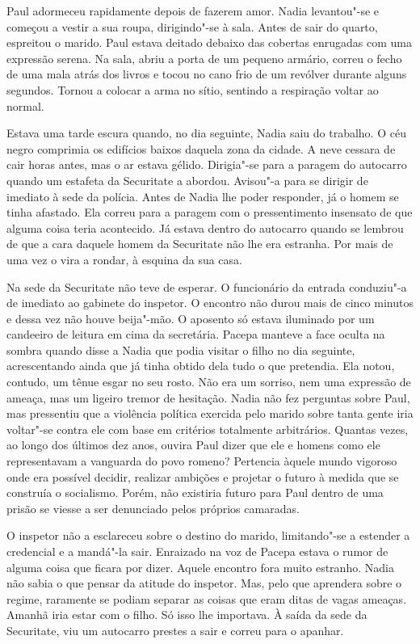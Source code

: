 Paul adormeceu rapidamente depois de fazerem amor. Nadia levantou"-se e
começou a vestir a sua roupa, dirigindo"-se à sala. Antes de sair do
quarto, espreitou o marido. Paul estava deitado debaixo das cobertas
enrugadas com uma expressão serena. Na sala, abriu a porta de um
pequeno armário, correu o fecho de uma mala atrás dos livros e tocou no
cano frio de um revólver durante alguns segundos. Tornou a colocar a
arma no sítio, sentindo a respiração voltar ao normal.

\bigskip

Estava uma tarde escura quando, no dia seguinte, Nadia saiu do trabalho.
O céu negro comprimia os edifícios baixos daquela zona da cidade. A
neve cessara de cair horas antes, mas o ar estava gélido. Dirigia"-se
para a paragem do autocarro quando um estafeta da Securitate a abordou.
Avisou"-a para se dirigir de imediato à sede da polícia. Antes de Nadia
lhe poder responder, já o homem se tinha afastado. Ela correu para a
paragem com o pressentimento insensato de que alguma coisa teria
acontecido. Já estava dentro do autocarro quando se lembrou de que a
cara daquele homem da Securitate não lhe era estranha. Por mais de uma
vez o vira a rondar, à esquina da sua casa.

Na sede da Securitate não
teve de esperar. O funcionário da entrada conduziu"-a de imediato ao
gabinete do inspetor. O encontro não durou mais de cinco minutos e
dessa vez não houve beija"-mão. O aposento só estava iluminado por um
candeeiro de leitura em cima da secretária. Pacepa manteve a face
oculta na sombra quando disse a Nadia que podia visitar o filho no dia
seguinte, acrescentando ainda que já tinha obtido dela tudo o que
pretendia. Ela notou, contudo, um tênue esgar no seu rosto. Não era um
sorriso, nem uma expressão de ameaça, mas um ligeiro tremor de
hesitação. Nadia não fez perguntas sobre Paul, mas pressentiu que a
violência política exercida pelo marido sobre tanta gente iria voltar"-se
contra ele com base em critérios totalmente arbitrários. Quantas vezes,
ao longo dos últimos dez anos, ouvira Paul dizer que ele e homens como
ele representavam a vanguarda do povo romeno? Pertencia àquele mundo
vigoroso onde era possível decidir, realizar ambições e projetar o
futuro à medida que se construía o socialismo. Porém, não existiria
futuro para Paul dentro de uma prisão se viesse a ser denunciado pelos
próprios camaradas.

O inspetor não a esclareceu sobre o destino do
marido, limitando"-se a estender a credencial e a mandá"-la sair.
Enraizado na voz de Pacepa estava o rumor de alguma coisa que ficara por
dizer. Aquele encontro fora muito estranho. Nadia não sabia o que pensar
da atitude do inspetor. Mas, pelo que aprendera sobre o regime,
raramente se podiam separar as coisas que eram ditas de vagas ameaças.
Amanhã iria estar com o filho. Só isso lhe importava. À saída da sede da
Securitate, viu um autocarro prestes a sair e correu para o apanhar.

